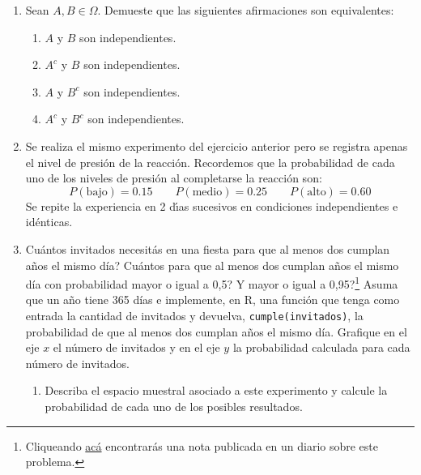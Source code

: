 \documentclass[a4paper, 11pt]{article}
\begin{document}
\begin{enumerate}
\begin{enumerate}
\end{enumerate}


\item Sean $A,B \in \Omega$. Demueste que las siguientes afirmaciones son equivalentes:
\begin{enumerate}
    \item $A$ y $B$ son independientes.
    \item $A^c$ y $B$ son independientes.
    \item $A$ y $B^c$ son independientes.
    \item $A^c$ y $B^c$ son independientes.
\end{enumerate}








\item Se realiza el mismo experimento del ejercicio anterior pero se registra apenas el nivel de presi\'on de la reacci\'{o}n. Recordemos que la probabilidad de cada uno de los niveles de
presi\'{o}n al completarse la reacci\'{o}n son:\vspace{-0.1cm}%
\[
P(\text{bajo})=0.15\qquad P(\text{medio})=0.25\qquad P(\text{alto})=0.60
\]
Se repite la experiencia en 2 d\'{\i}as sucesivos en condiciones
independientes e id\'{e}nticas.\vspace{-0.2cm}


\item \textquestiondown Cu\'antos invitados necesit\'as en una fiesta para que al menos dos cumplan a\~nos el mismo d\'ia? \textquestiondown Cu\'antos para que al menos dos cumplan a\~nos el mismo d\'ia con probabilidad mayor o igual a 0,5? \textquestiondown Y mayor o igual a 0,95?\footnote{Cliqueando \hyperlink{https://www.lanacion.com.ar/sociedad/desafio-que-es-paradoja-del-cumpleanos-nid2340525}{ac\'a} encontrar\'as una nota publicada en un diario sobre este problema.} Asuma que un a\~no tiene 365 d\'ias e implemente, en R, una funci\'on que tenga como entrada la cantidad de invitados y devuelva, \verb|cumple(invitados)|, la probabilidad de que al menos dos cumplan a\~nos el mismo d\'ia. Grafique en el eje $x$ el n\'umero de invitados y en el eje $y$ la probabilidad calculada para cada n\'umero de invitados.




\begin{enumerate}
	\item Describa el espacio muestral asociado a este experimento y calcule la probabilidad de cada uno de los posibles resultados.
	

\end{enumerate}
\end{enumerate}
\end{document}
